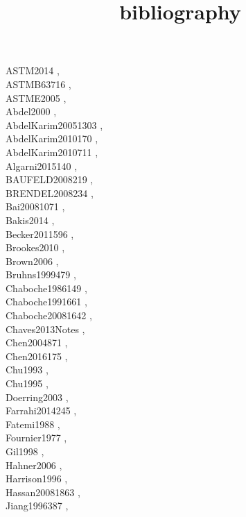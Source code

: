 \documentclass{article}
\begin{document}
\title{bibliography}

ASTM2014 \cite{ASTM2014}, \\
ASTMB63716 \cite{ASTMB63716}, \\
ASTME2005 \cite{ASTME2005}, \\
Abdel2000 \cite{Abdel2000}, \\
AbdelKarim20051303 \cite{AbdelKarim20051303}, \\
AbdelKarim2010170 \cite{AbdelKarim2010170}, \\
AbdelKarim2010711 \cite{AbdelKarim2010711}, \\
Algarni2015140 \cite{Algarni2015140}, \\
BAUFELD2008219 \cite{BAUFELD2008219}, \\
BRENDEL2008234 \cite{BRENDEL2008234}, \\
Bai20081071 \cite{Bai20081071}, \\
Bakis2014 \cite{Bakis2014}, \\
Becker2011596 \cite{Becker2011596}, \\
Brookes2010 \cite{Brookes2010}, \\
Brown2006 \cite{Brown2006}, \\
Bruhns1999479 \cite{Bruhns1999479}, \\
Chaboche1986149 \cite{Chaboche1986149}, \\
Chaboche1991661 \cite{Chaboche1991661}, \\
Chaboche20081642 \cite{Chaboche20081642}, \\
Chaves2013Notes \cite{Chaves2013Notes}, \\
Chen2004871 \cite{Chen2004871}, \\
Chen2016175 \cite{Chen2016175}, \\
Chu1993 \cite{Chu1993}, \\
Chu1995 \cite{Chu1995}, \\
Doerring2003 \cite{Doerring2003}, \\
Farrahi2014245 \cite{Farrahi2014245}, \\
Fatemi1988 \cite{Fatemi1988}, \\
Fournier1977 \cite{Fournier1977}, \\
Gil1998 \cite{Gil1998}, \\
Hahner2006 \cite{Hahner2006}, \\
Harrison1996 \cite{Harrison1996}, \\
Hassan20081863 \cite{Hassan20081863}, \\
Jiang1996387 \cite{Jiang1996387}, \\
\end{document}
